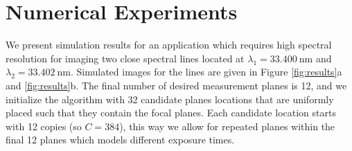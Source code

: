 \documentclass{article}
\begin{document}
\section{Numerical Experiments}
We present simulation results for an application which requires high spectral
resolution for imaging two close spectral lines located at $\lambda_1 =
\SI{33.400}{\nano\metre}$ and $\lambda_2 = \SI{33.402}{\nano\metre}$. Simulated
images for the lines are given in Figure \ref{fig:results}a and
\ref{fig:results}b.  The final number of desired measurement planes is 12, and
we initialize the algorithm with 32 candidate planes locations that are
uniformly placed such that they contain the focal planes. Each candidate
location starts with 12 copies (so $C=384$), this way we allow for repeated
planes within the final 12 planes which models different exposure times.
\end{document}
